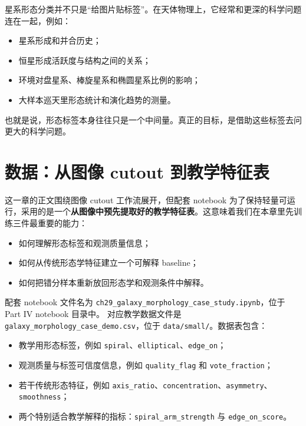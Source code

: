 星系形态分类并不只是“给图片贴标签”。在天体物理上，它经常和更深的科学问题连在一起，例如：

\begin{itemize}
    \item 星系形成和并合历史；
    \item 恒星形成活跃度与结构之间的关系；
    \item 环境对盘星系、棒旋星系和椭圆星系比例的影响；
    \item 大样本巡天里形态统计和演化趋势的测量。
\end{itemize}

也就是说，形态标签本身往往只是一个中间量。真正的目标，是借助这些标签去问更大的科学问题。

\section{数据：从图像 cutout 到教学特征表}

这一章的正文围绕图像 cutout 工作流展开，但配套 notebook 为了保持轻量可运行，采用的是一个\textbf{从图像中预先提取好的教学特征表}。这意味着我们在本章里先训练三件最重要的能力：

\begin{itemize}
    \item 如何理解形态标签和观测质量信息；
    \item 如何从传统形态学特征建立一个可解释 baseline；
    \item 如何把错分样本重新放回形态学和观测条件中解释。
\end{itemize}

配套 notebook 文件名为 \nolinkurl{ch29_galaxy_}\allowbreak\nolinkurl{morphology_case_}\allowbreak\nolinkurl{study.ipynb}，位于 Part IV notebook 目录中。
对应教学数据文件是 \nolinkurl{galaxy_morphology_case_demo.csv}，位于 \nolinkurl{data/small/}。数据表包含：

\begin{itemize}
    \item 教学用形态标签，例如 \texttt{spiral}、\texttt{elliptical}、\texttt{edge\_on}；
    \item 观测质量与标签可信度信息，例如 \texttt{quality\_flag} 和 \texttt{vote\_fraction}；
    \item 若干传统形态特征，例如 \texttt{axis\_ratio}、\texttt{concentration}、\texttt{asymmetry}、\texttt{smoothness}；
    \item 两个特别适合教学解释的指标：\texttt{spiral\_arm\_strength} 与 \texttt{edge\_on\_score}。
\end{itemize}

